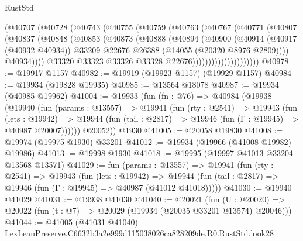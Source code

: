 \begin{lexlean}{RustStd}
\begin{coremodule}
                        (@40707
                          (@40728
                            (@40743
                              (@40755
                                (@40759
                                  (@40763
                                    (@40767
                                      (@40771
                                        (@40807
                                          (@40837
                                            (@40848
                                              (@40853
                                                (@40873
                                                  (@40888
                                                    (@40894
                                                      (@40900
                                                        (@40914
                                                          (@40917 (@40932 @40934))
                                                          @33209
                                                          @22676
                                                          @26388
                                                          (@14055 (@20320 @8976 @2809))))
                                                      @40934))))
                                              @33320
                                              @33323
                                              @33326
                                              @33328
                                              @22676)))))))))))))))))))))
@40978 := @19917 @1157
@40982 := @19919 (@19923 @1157) (@19929 @1157)
@40984 := @19934 (@19828 @19935)
@40985 := @13564 @18078
@40987 := @19934 (@40985 @19962)
@41004 := @19933
    (fun (fn : @76) =>
    @40984
      (@19938
        (@19940
          (fun (params : @13557) =>
          @19941
            (fun (rty : @2541) =>
            @19943
              (fun (lets : @19942) =>
              @19944 (fun (tail : @2817) => @19946 (fun (Γ : @19945) => @40987 @20007))))))
        @20052))
    @1930
@41005 := @20058 @19830
@41008 := @19974 (@19975 @1930) @33201
@41012 := @19934 (@19966 (@41008 @19982) @19986)
@41013 := @19998 @1930
@41018 := @19995 (@19997 @41013 @33204 @13568 @13571)
@41029 := fun (params : @13557) =>
  @19941
    (fun (rty : @2541) =>
    @19943
      (fun (lets : @19942) =>
      @19944 (fun (tail : @2817) => @19946 (fun (Γ : @19945) => @40987 (@41012 @41018)))))
@41030 := @19940 @41029
@41031 := @19938 @41030
@41040 := @20021
    (fun (U : @20020) => @20022 (fun (t : @7) => @20029 (@19934 (@20035 @33201 @13574) @20046)))
@41044 := @41005 (@41031 @41040) LexLeanPreserve.C6632b3a2e999d115038026ca828209de.R0.RustStd.look28

\end{coremodule}
\end{lexlean}
